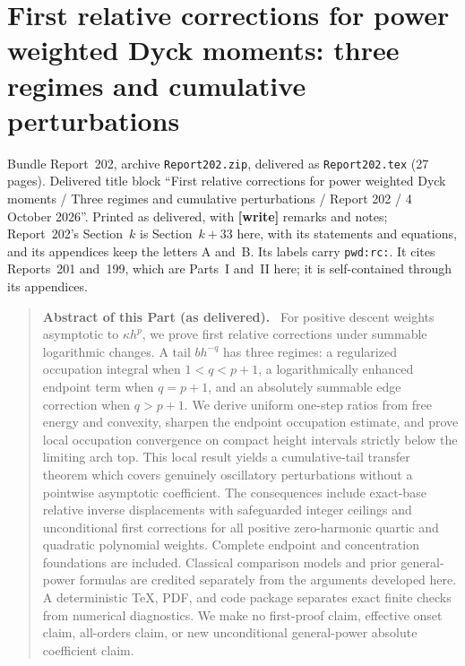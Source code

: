 \documentclass[11pt,letterpaper]{article}
\numberwithin{equation}{section}
\theoremstyle{remark}\newtheorem{remark}[theorem]{Remark}
\newcommand{\file}[1]{\nolinkurl{#1}}
\newenvironment{partabstract}{\begin{quote}\small\noindent\textbf{Abstract of this Part (as delivered).}\ }{\end{quote}}
\newcommand{\partsource}[1]{\par\noindent\begin{minipage}{\textwidth}\small #1\end{minipage}\par\medskip}
\begin{document}
\part{First relative corrections for power weighted Dyck moments: three regimes and cumulative perturbations}\label{pwd:rc:part}
\partsource{Bundle Report~202, archive \file{Report202.zip}, delivered as \file{Report202.tex} (27 pages). Delivered title block ``First relative corrections for power weighted Dyck moments / Three regimes and cumulative perturbations / Report 202 / 4 October 2026''. Printed as delivered, with \textbf{[write]} remarks and notes; Report~202's Section~$k$ is Section~$k+33$ here, with its statements and equations, and its appendices keep the letters A and~B. Its labels carry \file{pwd:rc:}. It cites Reports~201 and~199, which are Parts~I and~II here; it is self-contained through its appendices.}
\begin{partabstract}
For positive descent weights asymptotic to $\kappa h^p$, we prove first relative corrections under summable logarithmic changes. A tail $b h^{-q}$ has three regimes: a regularized occupation integral when $1<q<p+1$, a logarithmically enhanced endpoint term when $q=p+1$, and an absolutely summable edge correction when $q>p+1$. We derive uniform one-step ratios from free energy and convexity, sharpen the endpoint occupation estimate, and prove local occupation convergence on compact height intervals strictly below the limiting arch top. This local result yields a cumulative-tail transfer theorem which covers genuinely oscillatory perturbations without a pointwise asymptotic coefficient. The consequences include exact-base relative inverse displacements with safeguarded integer ceilings and unconditional first corrections for all positive zero-harmonic quartic and quadratic polynomial weights. Complete endpoint and concentration foundations are included. Classical comparison models and prior general-power formulas are credited separately from the arguments developed here. A deterministic TeX, PDF, and code package separates exact finite checks from numerical diagnostics. We make no first-proof claim, effective onset claim, all-orders claim, or new unconditional general-power absolute coefficient claim.
\end{partabstract}
\end{document}
